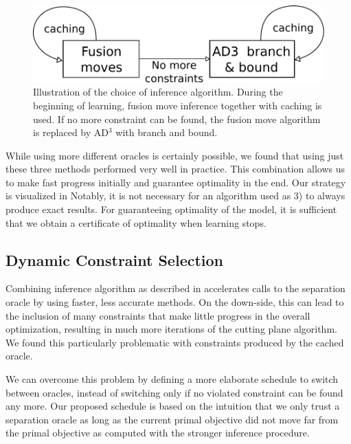 \begin{figure}
\centering
\includegraphics[width=\linewidth]{exact_learning/images/inference_algs}
\caption{%
Illustration of the choice of inference algorithm. During the beginning of learning,
fusion move inference together with caching is used. If no more constraint can be found,
the fusion move algorithm is replaced by AD$^3$ with branch and bound.
}
\end{figure}

While using more different oracles is certainly possible, we found
that using just these three methods performed very well in practice.  This
combination allows us to make fast progress initially and guarantee optimality
in the end. Our strategy is visualized in 
Notably, it is not necessary for an algorithm used as 3) to always produce
exact results. For guaranteeing optimality of the model, it is sufficient that
we obtain a certificate of optimality when learning stops.

\subsection{Dynamic Constraint Selection}
Combining inference algorithm as described in 
accelerates calls to the separation oracle by using faster, less accurate
methods. On the down-side, this can lead to the inclusion of many constraints
that make little progress in the overall optimization, resulting in much more
iterations of the cutting plane algorithm. We found this particularly problematic
with constraints produced by the cached oracle.

We can overcome this problem by defining a more elaborate schedule to switch
between oracles, instead of switching only if no violated constraint can be
found any more. Our proposed schedule is based on the intuition that we only
trust a separation oracle as long as the current primal objective did not move
far from the primal objective as computed with the stronger inference
procedure.

